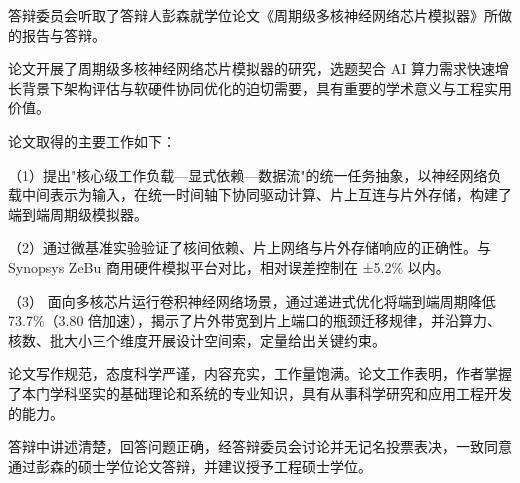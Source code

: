 答辩委员会听取了答辩人彭森就学位论文《周期级多核神经网络芯片模拟器》所做的报告与答辩。

论文开展了周期级多核神经网络芯片模拟器的研究，选题契合 AI 算力需求快速增长背景下架构评估与软硬件协同优化的迫切需要，具有重要的学术意义与工程实用价值。

论文取得的主要工作如下：

（1）提出"核心级工作负载—显式依赖—数据流"的统一任务抽象，以神经网络负载中间表示为输入，在统一时间轴下协同驱动计算、片上互连与片外存储，构建了端到端周期级模拟器。

（2）通过微基准实验验证了核间依赖、片上网络与片外存储响应的正确性。与 Synopsys ZeBu 商用硬件模拟平台对比，相对误差控制在 ±5.2\% 以内。

（3） 面向多核芯片运行卷积神经网络场景，通过递进式优化将端到端周期降低 73.7\%（3.80 倍加速），揭示了片外带宽到片上端口的瓶颈迁移规律，并沿算力、核数、批大小三个维度开展设计空间索，定量给出关键约束。

论文写作规范，态度科学严谨，内容充实，工作量饱满。论文工作表明，作者掌握了本门学科坚实的基础理论和系统的专业知识，具有从事科学研究和应用工程开发的能力。

答辩中讲述清楚，回答问题正确，经答辩委员会讨论并无记名投票表决，一致同意通过彭森的硕士学位论文答辩，并建议授予工程硕士学位。
